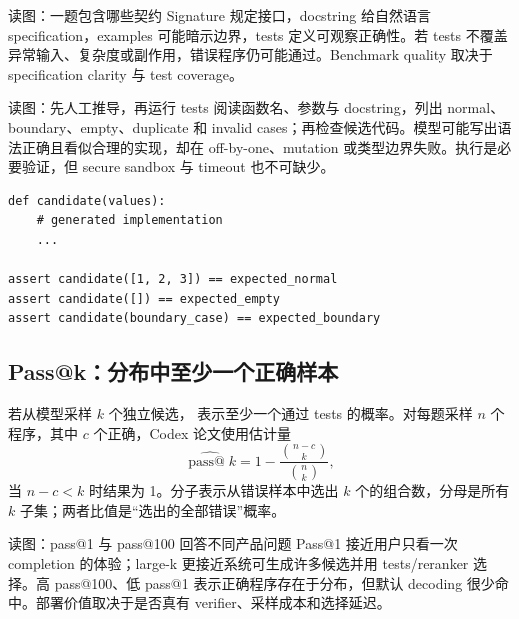 \begin{knowledgebox}{读图：一题包含哪些契约}
Signature 规定接口，docstring 给自然语言 specification，examples 可能暗示边界，tests 定义可观察正确性。若 tests 不覆盖异常输入、复杂度或副作用，错误程序仍可能通过。Benchmark quality 取决于 specification clarity 与 test coverage。
\end{knowledgebox}


\begin{knowledgebox}{读图：先人工推导，再运行 tests}
阅读函数名、参数与 docstring，列出 normal、boundary、empty、duplicate 和 invalid cases；再检查候选代码。模型可能写出语法正确且看似合理的实现，却在 off-by-one、mutation 或类型边界失败。执行是必要验证，但 secure sandbox 与 timeout 也不可缺少。
\end{knowledgebox}

\begin{lstlisting}[caption={HumanEval-style functional check 的简化形式}]
def candidate(values):
    # generated implementation
    ...

assert candidate([1, 2, 3]) == expected_normal
assert candidate([]) == expected_empty
assert candidate(boundary_case) == expected_boundary
\end{lstlisting}

\subsection{Pass@k：分布中至少一个正确样本}

若从模型采样 $k$ 个独立候选， 表示至少一个通过 tests 的概率。对每题采样 $n$ 个程序，其中 $c$ 个正确，Codex 论文使用估计量
\[
\widehat{\operatorname{pass@}k}
=1-\frac{\binom{n-c}{k}}{\binom{n}{k}},
\]
当 $n-c<k$ 时结果为 1。分子表示从错误样本中选出 $k$ 个的组合数，分母是所有 $k$ 子集；两者比值是“选出的全部错误”概率。


\begin{knowledgebox}{读图：pass@1 与 pass@100 回答不同产品问题}
Pass@1 接近用户只看一次 completion 的体验；large-k 更接近系统可生成许多候选并用 tests/reranker 选择。高 pass@100、低 pass@1 表示正确程序存在于分布，但默认 decoding 很少命中。部署价值取决于是否真有 verifier、采样成本和选择延迟。
\end{knowledgebox}

